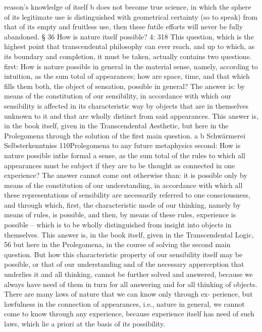reason’s knowledge of itself b does not become true science, in which the
sphere of its legitimate use is distinguished with geometrical certainty
(so to speak) from that of its empty and fruitless use, then these futile
efforts will never be fully abandoned.
§ 36
How is nature itself possible?
4: 318
This question, which is the highest point that transcendental philosophy
can ever reach, and up to which, as its boundary and completion, it must
be taken, actually contains two questions.
ﬁrst: How is nature possible in general in the material sense, namely,
according to intuition, as the sum total of appearances; how are space,
time, and that which ﬁlls them both, the object of sensation, possible in
general? The answer is: by means of the constitution of our sensibility,
in accordance with which our sensibility is affected in its characteristic
way by objects that are in themselves unknown to it and that are wholly
distinct from said appearances. This answer is, in the book itself, given
in the Transcendental Aesthetic, but here in the Prolegomena through the
solution of the ﬁrst main question.
a
b
Schwärmerei
Selbsterkenntniss
110Prolegomena to any future metaphysics
second: How is nature possible inthe formal a sense, as the sum total
of the rules to which all appearances must be subject if they are to be
thought as connected in one experience? The answer cannot come out
otherwise than: it is possible only by means of the constitution of our
understanding, in accordance with which all these representations of
sensibility are necessarily referred to one consciousness, and through
which, ﬁrst, the characteristic mode of our thinking, namely by means
of rules, is possible, and then, by means of these rules, experience is
possible – which is to be wholly distinguished from insight into objects in
themselves. This answer is, in the book itself, given in the Transcendental
Logic, 56 but here in the Prolegomena, in the course of solving the second
main question.
But how this characteristic property of our sensibility itself may be
possible, or that of our understanding and of the necessary apperception
that underlies it and all thinking, cannot be further solved and answered,
because we always have need of them in turn for all answering and for
all thinking of objects.
There are many laws of nature that we can know only through ex-
perience, but lawfulness in the connection of appearances, i.e., nature
in general, we cannot come to know through any experience, because
experience itself has need of such laws, which lie a priori at the basis of
its possibility.
